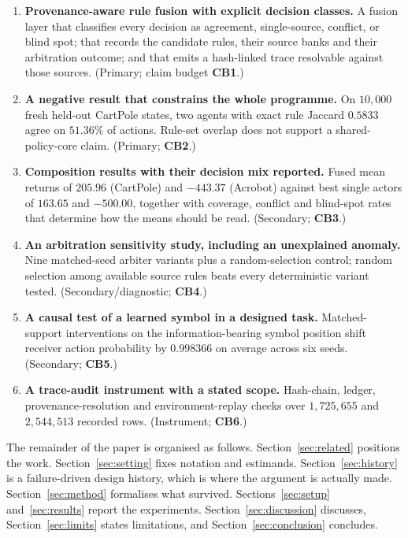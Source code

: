 \documentclass[11pt,a4paper]{article}
\begin{document}
\begin{enumerate}
  \item \textbf{Provenance-aware rule fusion with explicit decision classes.} A fusion layer that classifies every decision as agreement, single-source, conflict, or blind spot; that records the candidate rules, their source banks and their arbitration outcome; and that emits a hash-linked trace resolvable against those sources. (Primary; claim budget \textbf{CB1}.)
  \item \textbf{A negative result that constrains the whole programme.} On $10{,}000$ fresh held-out CartPole states, two agents with exact rule Jaccard $0.5833$ agree on $51.36\%$ of actions. Rule-set overlap does not support a shared-policy-core claim. (Primary; \textbf{CB2}.)
  \item \textbf{Composition results with their decision mix reported.} Fused mean returns of $205.96$ (CartPole) and $-443.37$ (Acrobot) against best single actors of $163.65$ and $-500.00$, together with coverage, conflict and blind-spot rates that determine how the means should be read. (Secondary; \textbf{CB3}.)
  \item \textbf{An arbitration sensitivity study, including an unexplained anomaly.} Nine matched-seed arbiter variants plus a random-selection control; random selection among available source rules beats every deterministic variant tested. (Secondary/diagnostic; \textbf{CB4}.)
  \item \textbf{A causal test of a learned symbol in a designed task.} Matched-support interventions on the information-bearing symbol position shift receiver action probability by $0.998366$ on average across six seeds. (Secondary; \textbf{CB5}.)
  \item \textbf{A trace-audit instrument with a stated scope.} Hash-chain, ledger, provenance-resolution and environment-replay checks over $1{,}725{,}655$ and $2{,}544{,}513$ recorded rows. (Instrument; \textbf{CB6}.)
\end{enumerate}

The remainder of the paper is organised as follows. Section~\ref{sec:related} positions the work. Section~\ref{sec:setting} fixes notation and estimands. Section~\ref{sec:history} is a failure-driven design history, which is where the argument is actually made. Section~\ref{sec:method} formalises what survived. Sections~\ref{sec:setup} and~\ref{sec:results} report the experiments. Section~\ref{sec:discussion} discusses, Section~\ref{sec:limits} states limitations, and Section~\ref{sec:conclusion} concludes.
\end{document}
